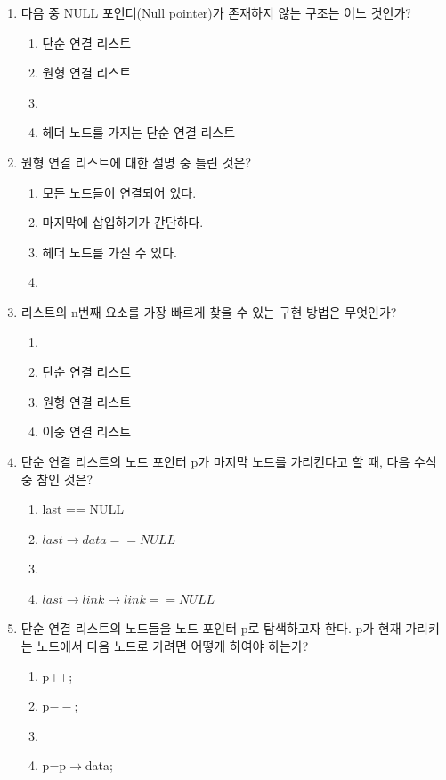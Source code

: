 \documentclass[11pt,a4paper]{article}
\begin{document}
\begin{enumerate}
\item 다음 중 NULL 포인터(Null pointer)가 존재하지 않는 구조는 어느 것인가?
	\begin{enumerate}
		\item 단순 연결 리스트
		\item 원형 연결 리스트
		\item {}
		\item 헤더 노드를 가지는 단순 연결 리스트
	\end{enumerate}

\item 원형 연결 리스트에 대한 설명 중 틀린 것은?
	\begin{enumerate}
		\item 모든 노드들이 연결되어 있다.
		\item 마지막에 삽입하기가 간단하다.
		\item 헤더 노드를 가질 수 있다.
		\item {}
	\end{enumerate}

\item 리스트의 n번째 요소를 가장 빠르게 찾을 수 있는 구현 방법은 무엇인가?
	\begin{enumerate}
		\item {}
		\item 단순 연결 리스트
		\item 원형 연결 리스트
		\item 이중 연결 리스트
	\end{enumerate}
	
\item 단순 연결 리스트의 노드 포인터 p가 마지막 노드를 가리킨다고 할 때, 다음 수식 중 참인 것은?
	\begin{enumerate}
		\item last == NULL
		\item $last\rightarrow data == NULL$
		\item {}
		\item $last\rightarrow link\rightarrow link == NULL$
	\end{enumerate}

\item 단순 연결 리스트의 노드들을 노드 포인터 p로 탐색하고자 한다. p가 현재 가리키는 노드에서 다음 노드로 가려면 어떻게 하여야 하는가?
	\begin{enumerate}
		\item p++;
		\item p$--$;
		\item {}
		\item p=p$\rightarrow $data;
	\end{enumerate}
	

\end{enumerate}
\end{document}

